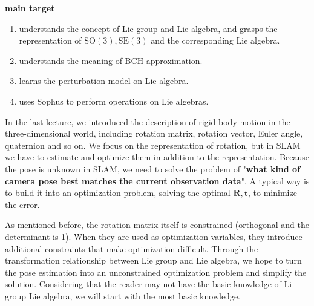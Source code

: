 \begin{mdframed}  
	\textbf{main target}
	\begin{enumerate}
		\item understands the concept of Lie group and Lie algebra, and grasps the representation of $\mathrm{SO}(3), \mathrm{SE}(3)$ and the corresponding Lie algebra.
		\item understands the meaning of BCH approximation.
		\item learns the perturbation model on Lie algebra.
		\item uses Sophus to perform operations on Lie algebras.
	\end{enumerate}
\end{mdframed} 

In the last lecture, we introduced the description of rigid body motion in the three-dimensional world, including rotation matrix, rotation vector, Euler angle, quaternion and so on. We focus on the representation of rotation, but in SLAM we have to estimate and optimize them in addition to the representation. Because the pose is unknown in SLAM, we need to solve the problem of "\textbf{what kind of camera pose best matches the current observation data}". A typical way is to build it into an optimization problem, solving the optimal $\bm{R}, \bm{t}$, to minimize the error.

As mentioned before, the rotation matrix itself is constrained (orthogonal and the determinant is 1). When they are used as optimization variables, they introduce additional constraints that make optimization difficult. Through the transformation relationship between Lie group and Lie algebra, we hope to turn the pose estimation into an unconstrained optimization problem and simplify the solution. Considering that the reader may not have the basic knowledge of Li group Lie algebra, we will start with the most basic knowledge.
